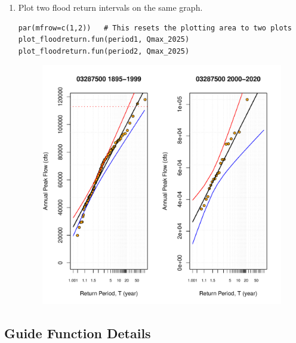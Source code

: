 \documentclass{tufte-handout}\usepackage[]{graphicx}\usepackage[]{xcolor}
\makeatletter
\def\maxwidth{ %
  \ifdim\Gin@nat@width>\linewidth
    \linewidth
  \else
    \Gin@nat@width
  \fi
}
\newenvironment{knitrout}{}{} %
\makeatother
\begin{document}
\begin{enumerate}
\item Plot two flood return intervals on the same graph.

\begin{verbatim}
par(mfrow=c(1,2))   # This resets the plotting area to two plots
plot_floodreturn.fun(period1, Qmax_2025)
plot_floodreturn.fun(period2, Qmax_2025)
\end{verbatim}

\begin{figure}[h]
\begin{knitrout}
\color{fgcolor}
\includegraphics[width=\maxwidth]{figure/unnamed-chunk-20-1} 
\end{knitrout}
\end{figure}

\end{enumerate}

\clearpage

\subsection{Guide Function Details}
\end{document}
